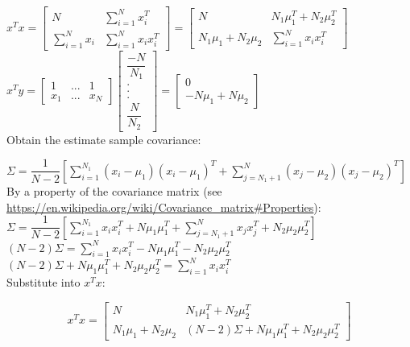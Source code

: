 \documentclass[12pt]{report}
\begin{document}
$x^Tx = \begin{bmatrix}
        N & \sum_{i=1}^{N} x_i^T  \\
        \sum_{i=1}^{N} x_i & \sum_{i=1}^{N} x_i x_i^T
    \end{bmatrix} = \begin{bmatrix}
        N & N_1 \mu_1^T + N_2 \mu_2^T  \\
        N_1 \mu_1 + N_2 \mu_2 & \sum_{i=1}^{N} x_i x_i^T
    \end{bmatrix}$\\

$x^Ty = \begin{bmatrix}
    1 & ... & 1 \\
    x_1 & ... & x_N
\end{bmatrix}
\begin{bmatrix}
    \dfrac{-N}{N_1} \\
    . \\
    . \\
    . \\
    \dfrac{N}{N_2}
\end{bmatrix} =
\begin{bmatrix}
    0 \\
    -N\mu_1 + N \mu_2
\end{bmatrix}$\\

Obtain the estimate sample covariance:

$
 \Sigma = \dfrac{1}{N-2} [\sum_{i=1}^{N_1} (x_i- \mu_1)(x_i - \mu_1)^T + \sum_{j=N_1+1}^{N} (x_j-\mu_2)(x_j - \mu_2)^T]
$\\

By a property of the covariance matrix (see \url{https://en.wikipedia.org/wiki/Covariance_matrix#Properties}):\\

$
 \Sigma = \dfrac{1}{N-2} [\sum_{i=1}^{N_1} x_ix_i^T + N \mu_1 \mu_1^T + \sum_{j=N_1+1}^{N} x_j x_j^T + N_2 \mu_2 \mu_2^T]
$\\

$
 (N-2) \Sigma =  \sum_{i=1}^{N} x_ix_i^T - N \mu_1 \mu_1^T - N_2 \mu_2 \mu_2^T
$\\

$
 (N-2) \Sigma + N \mu_1 \mu_1^T + N_2 \mu_2 \mu_2^T =  \sum_{i=1}^{N} x_ix_i^T
$\\

Substitute into $x^Tx$:

\begin{equation}
    x^Tx = \begin{bmatrix}
        N & N_1 \mu_1^T + N_2 \mu_2^T  \\
        N_1 \mu_1 + N_2 \mu_2 & (N-2) \Sigma + N \mu_1 \mu_1^T + N_2 \mu_2 \mu_2^T
    \end{bmatrix}
\end{equation}
\end{document}
